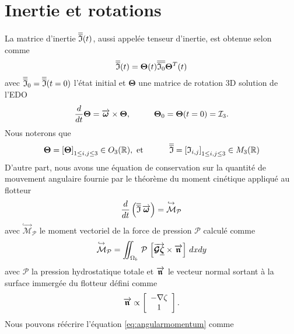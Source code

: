 \section{Inertie et rotations}

\noindent La matrice d'inertie $\overline{\overline{\mathfrak{I}}}(t)$, aussi appelée tenseur d'inertie, est obtenue selon \citet{lannes_dynamics_2017} comme
\begin{equation}
\overline{\overline{\mathfrak{I}}}(t) = \mathbf{\Theta} (t)\overline{\overline{\mathfrak{I}_0}}\mathbf{\Theta}^{T} (t)
\end{equation}
avec $\overline{\overline{\mathfrak{I}}}_0 = \overline{\overline{\mathfrak{I}}}(t=0)$ l'état initial et $\mathbf{\Theta}$ une matrice de rotation 3D solution de l'EDO 
\begin{equation}
\frac{d}{dt} \mathbf{\Theta} = \overrightarrow{\boldsymbol{\omega}} \times \mathbf{\Theta}, \hspace{1cm}\mathbf{\Theta}_{0} = \mathbf{\Theta}(t=0) = \mathcal{I}_{3}.
\end{equation}
Nous noterons que
\begin{equation}
	\mathbf{\Theta} = \left[\mathbf{\Theta}\right]_{1 \leq i, j \leq 3}\in O_3(\mathbb{R}) , \text{ et }\hspace{1cm} \overline{\overline{\mathfrak{I}}} = \left[\mathfrak{I}_{i, j}\right]_{1 \leq i, j \leq 3}\in M_3(\mathbb{R})
\end{equation}
D'autre part, nous avons une équation de conservation sur la quantité de mouvement angulaire fournie par le théorème du moment cinétique appliqué au flotteur
\begin{equation}
	\frac{d}{dt} \left(\overline{\overline{\mathfrak{I}}}\,\overrightarrow{\boldsymbol{\omega}}\right) = \overset{\hookrightarrow}{\mathcal{M}}_\mathcal{P} \label{eq:angularmomentum}
\end{equation}
avec $\overset{\hookrightarrow}{\mathcal{M}}_\mathcal{P}$ le moment vectoriel de la force de pression $\mathcal{P}$ calculé comme
\begin{equation}
	\overset{\hookrightarrow}{\mathcal{M}}_\mathcal{P} = \iint_{\Omega_b}\,\mathcal{P}\, \left[\overrightarrow{\boldsymbol{\mathcal{G}\underline{\boldsymbol{\zeta}}}} \times \overrightarrow{\boldsymbol{\mathfrak{n}}} \right]\,dxdy \label{eq:momentvectoriel}
\end{equation}
avec $\mathcal{P}$ la pression hydrostatique totale et $\overrightarrow{\boldsymbol{\mathfrak{n}}}$ le vecteur normal sortant à la surface immergée du flotteur défini comme 
\begin{equation}
\overrightarrow{\boldsymbol{\mathfrak{n}}} \propto \left[\begin{array}{c} -\nabla \zeta\\ 1\\  \end{array}\right].
\end{equation}
\noindent Nous pouvons réécrire l'équation \eqref{eq:angularmomentum} comme
